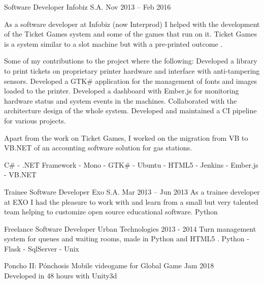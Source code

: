 \documentclass[10pt,a4paper]{article}
\begin{document}
\jobdescription
    { Software Developer }
    { Infobiz S.A. }
    { Nov 2013 -- Feb 2016 }
    {
        As a software developer at Infobiz (now Interprod) I helped with the development of the Ticket Games system  and some of the games that run on it. Ticket Games is a system similar to a slot machine but with a pre-printed outcome \href{https://web.archive.org/web/20180903134404/http://infobiz.com.ar/english/ticket_games.php}{\ExternalLink}.

        

        Some of my contributions to the project where the following:
        Developed a library to print tickets on proprietary printer hardware and interface with anti-tampering sensors.
        Developed a GTK\# application for the management of fonts and images loaded to the printer.
        Developed a dashboard with Ember.js for monitoring hardware status and system events in the machines.
        Collaborated with the architecture design of the whole system.
        Developed and maintained a CI pipeline for various projects.

        Apart from the work on Ticket Games, I worked on the migration from VB to VB.NET of an accounting software solution for gas stations.
    }
    {
        C\# - .NET Framework - Mono - GTK\# - Ubuntu - HTML5 - Jenkins - Ember.js - VB.NET
    }

\jobdescription
    { Trainee Software Developer }
    { Exo S.A. }
    { Mar 2013 -- Jun 2013 }
    {
        As a trainee developer at EXO I had the pleasure to work with and learn from a small but very talented team helping to customize open source educational software.
    }
    {
        Python
    }

\jobdescription
    { Freelance Software Developer }
    { Urban Technologies }
    { 2013 - 2014}
    {
        Turn management system for queues and waiting rooms, made in Python
        and HTML5 \href{https://web.archive.org/web/20180905152241/www.eitsa.com.ar/producto.php?c=3&p=14}{\ExternalLink}.
    }
    {
        Python - Flask - SqlServer - Unix
    }



\iffalse 

\spacedhrule{0.8em}{-0.4em} %


\vspace{0.2em}
\headedsection
    { Poncho II: Pónchosis \href{https://globalgamejam.org/2018/games/poncho-ii-p\%C3\%B3nchosis}{\ExternalLink} }
    { \textsc{} }{
    \headedsubsection
        { Mobile videogame for Global Game Jam }
        { 2018 }
        { \\ Developed in 48 hours with Unity3d }
}
\end{document}
